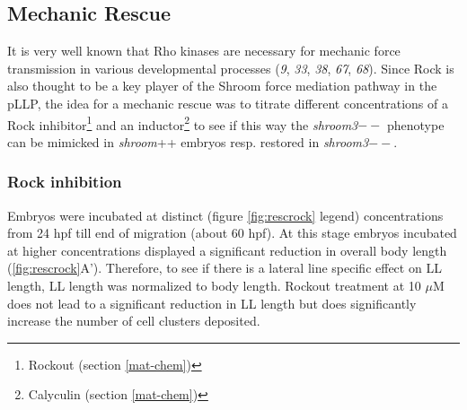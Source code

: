 \documentclass[11pt,singlespacinge,twoside]{reedthesis} %
\begin{document}
\hypertarget{res-rockresc}{%
\subsection{Mechanic Rescue}\label{res-rockresc}}

It is very well known that Rho kinases are necessary for mechanic force transmission in various developmental processes (\emph{9}, \emph{33}, \emph{38}, \emph{67}, \emph{68}). Since Rock is also thought to be a key player of the Shroom force mediation pathway in the pLLP, the idea for a mechanic rescue was to titrate different concentrations of a Rock inhibitor\footnote{Rockout (section \ref{mat-chem})} and an inductor\footnote{Calyculin (section \ref{mat-chem})} to see if this way the \emph{shroom3}\(--\) phenotype can be mimicked in \emph{shroom}++ embryos resp. restored in \emph{shroom3}\(--\).

\hypertarget{rock-inhibition}{%
\subsubsection{Rock inhibition}\label{rock-inhibition}}

Embryos were incubated at distinct (figure \ref{fig:rescrock} legend) concentrations from 24 hpf till end of migration (about 60 hpf). At this stage embryos incubated at higher concentrations displayed a significant reduction in overall body length (\ref{fig:rescrock}A'). Therefore, to see if there is a lateral line specific effect on LL length, LL length was normalized to body length. Rockout treatment at 10 \(\mu\)M does not lead to a significant reduction in LL length but does significantly increase the number of cell clusters deposited.\newline
\end{document}
